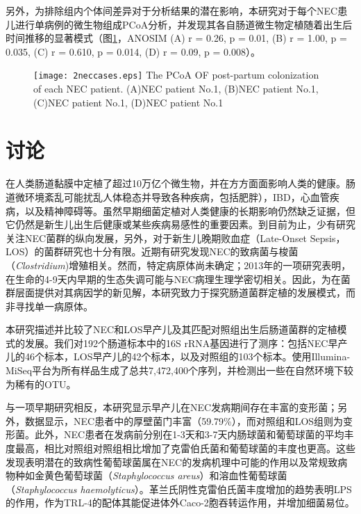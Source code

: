 {{      另外，为排除组内个体间差异对于分析结果的潜在影响，本研究对于每个NEC患儿进行单病例的微生物组成PCoA分析，并发现其各自肠道微生物定植随着出生后时间推移的显著模式（图\ref{fig:2neccases}，ANOSIM (A) r = 0.26, p = 0.01, (B) r = 1.00, p = 0.035, (C) r = 0.610, p = 0.014, (D) r = 0.09, p = 0.008）。
          \begin{figure}[!htp]
            \centering
            \texttt{[image: 2neccases.eps]}
              {The PCoA OF post-partum colonization of each NEC patient. (A)NEC patient No.1, (B)NEC patient No.1, (C)NEC patient No.1, (D)NEC patient No.1}
            \label{fig:2neccases}
          \end{figure}

\section{讨论}
在人类肠道黏膜中定植了超过10万亿个微生物\cite{Ley2006}，并在方方面面影响人类的健康\cite{Sekirov2009}。肠道微环境紊乱可能扰乱人体稳态并导致各种疾病，包括肥胖\cite{Liu2017}），IBD\cite{Ley2006}，心血管疾病\cite{Wang2011}，以及精神障碍\cite{Rogers2016}等。虽然早期细菌定植对人类健康的长期影响仍然缺乏证据，但它仍然是新生儿出生后健康或某些疾病易感性的重要因素。到目前为止，少有研究关注NEC菌群的纵向发展，另外，对于新生儿晚期败血症（Late-Onset Sepsis，LOS）的菌群研究也十分有限。近期有研究发现NEC的致病菌与梭菌（\textit{Clostridium})增殖相关\cite{hosny2017updating}。然而，特定病原体尚未确定；2013年的一项研究表明，在生命的4-9天内早期的生态失调可能与NEC病理生理学密切相关\cite{morrow2013early}。因此，为在菌群层面提供对其病因学的新见解，本研究致力于探究肠道菌群定植的发展模式，而非寻找单一病原体。

本研究描述并比较了NEC和LOS早产儿及其匹配对照组出生后肠道菌群的定植模式的发展。我们对192个肠道标本中的16S rRNA基因进行了测序：包括NEC早产儿的46个标本，LOS早产儿的42个标本，以及对照组的103个标本。使用Illumina-MiSeq平台为所有样品生成了总共7,472,400个序列，并检测出一些在自然环境下较为稀有的OTU。

与一项早期研究相反，本研究显示早产儿在NEC发病期间存在丰富的变形菌；另外，数据显示，NEC患者中的厚壁菌门丰富（59.79\%），而对照组和LOS组则为变形菌。此外，NEC患者在发病前分别在1-3天和3-7天内肠球菌和葡萄球菌的平均丰度最高，相比对照组对照组相比增加了克雷伯氏菌和葡萄球菌的丰度也更高。这些发现表明潜在的致​​病性葡萄球菌属在NEC的发病机理中可能的作用以及常规致病物种如金黄色葡萄球菌（\textit{Staphylococcus areus}）和溶血性葡萄球菌（\textit{Staphylococcus haemolyticus}）。革兰氏阴性克雷伯氏菌丰度增加的趋势表明LPS的作用，作为TRL-4的配体其能促进体外Caco-2胞吞转运作用\cite{panigrahi1996escherichia}，并增加细菌易位\cite{Deitch1987}。

}}
